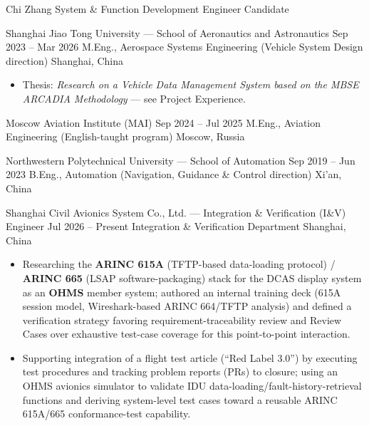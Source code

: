 \documentclass{resume}
\begin{document}
\resumeheader
  {Chi Zhang}
  {System \& Function Development Engineer Candidate}
  {%
    \contactsep
    \contactsep
    \contactsep
  }


\resumeentry
  {Shanghai Jiao Tong University --- School of Aeronautics and Astronautics}
  {Sep 2023 -- Mar 2026}
  {M.Eng., Aerospace Systems Engineering (Vehicle System Design direction)}
  {Shanghai, China}
\begin{itemize}
  \item Thesis: \textit{Research on a Vehicle Data Management System based on the MBSE ARCADIA Methodology} --- see Project Experience.
\end{itemize}

\resumeentry
  {Moscow Aviation Institute (MAI)}
  {Sep 2024 -- Jul 2025}
  {M.Eng., Aviation Engineering (English-taught program)}
  {Moscow, Russia}

\resumeentry
  {Northwestern Polytechnical University --- School of Automation}
  {Sep 2019 -- Jun 2023}
  {B.Eng., Automation (Navigation, Guidance \& Control direction)}
  {Xi'an, China}


\resumeentry
  {Shanghai Civil Avionics System Co., Ltd. --- Integration \& Verification (I\&V) Engineer}
  {Jul 2026 -- Present}
  {Integration \& Verification Department}
  {Shanghai, China}
\begin{itemize}
  \item Researching the \textbf{ARINC 615A} (TFTP-based data-loading protocol) / \textbf{ARINC 665} (LSAP software-packaging) stack for the DCAS display system as an \textbf{OHMS} member system; authored an internal training deck (615A session model, Wireshark-based ARINC 664/TFTP analysis) and defined a verification strategy favoring requirement-traceability review and Review Cases over exhaustive test-case coverage for this point-to-point interaction.
  \item Supporting integration of a flight test article (``Red Label 3.0'') by executing test procedures and tracking problem reports (PRs) to closure; using an OHMS avionics simulator to validate IDU data-loading/fault-history-retrieval functions and deriving system-level test cases toward a reusable ARINC 615A/665 conformance-test capability.
\end{itemize}
\end{document}
